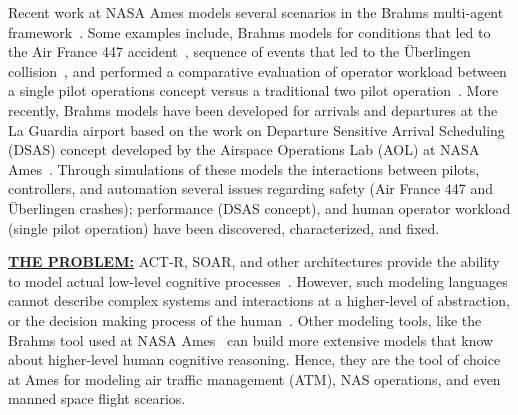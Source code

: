 \documentclass[12pt]{article}
\newcommand{\bi}{\begin{itemize}[leftmargin=0.7cm]}
\newcommand{\ei}{\end{itemize}}
\begin{document}
Recent work at NASA Ames models several scenarios in the Brahms multi-agent framework~\cite{clancey1998brahms,SierhuisPhD}. Some examples include, Brahms models for conditions that led to the Air France 447 accident~\cite{hunter:aamas13}, sequence of events that led to the \"{U}berlingen collision~\cite{Rungta:2013}, and performed a comparative evaluation of operator workload between a single pilot operations concept versus a traditional two pilot
operation~\cite{Stocker:2015}. More recently, Brahms models have been developed for arrivals and departures at the La Guardia airport based on the work on Departure Sensitive Arrival Scheduling (DSAS) concept developed by the Airspace Operations Lab (AOL) at NASA Ames~\cite{dsas}. Through simulations of these models the interactions between pilots, controllers, and automation several issues regarding safety (Air France 447 and  \"{U}berlingen crashes); performance (DSAS concept), and human operator workload (single pilot operation) have been discovered, characterized, and fixed. 




\noindent
\underline{{\bf THE PROBLEM:}} 
ACT-R, SOAR, and other architectures provide the ability to model actual low-level cognitive processes~\cite{anderson1997act,laird1987soar,lebiere2013cognitive,liu2009qn,lundinsimulating}. However,  such modeling languages cannot  describe complex systems and interactions at a higher-level of abstraction, or   the decision making process of the human~\cite{pritchett2011simulating}. 
Other modeling tools, like the Brahms tool used at NASA Ames~\cite{Rungta:2013,Clancey:1998:BSP:306180.306196,brahms-semantics,brahms-jelia,SierhuisPhD} can build more extensive models that know about higher-level human cognitive reasoning. Hence, they are the tool of choice at Ames for modeling air traffic management (ATM), NAS operations, and even manned space flight scearios.
\end{document}
